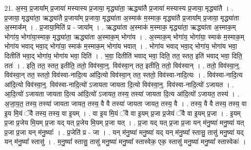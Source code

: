 \documentclass[17pt]{extarticle}
\begin{document}
21. अ॒स्य॒ प्र॒जाया᳚म् प्र॒जाया॑ मस्यास्य प्र॒जाया॒ मृद्ध्या॑ता॒ ऋद्ध्या॑तै प्र॒जाया॑ मस्यास्य प्र॒जाया॒ मृद्ध्या॑तै । . प्र॒जाया॒ मृद्ध्या॑ता॒ ऋद्ध्या॑तै प्र॒जाया᳚म् प्र॒जाया॒ मृद्ध्या॑ता अ॒स्माक॑ म॒स्माक॒ मृद्ध्या॑तै प्र॒जाया᳚म् प्र॒जाया॒ मृद्ध्या॑ता अ॒स्माक᳚म् । . प्र॒जाया॒मिति॑ प्र - जाया᳚म् । . ऋद्ध्या॑ता अ॒स्माक॑ म॒स्माक॒ मृद्ध्या॑ता॒ ऋद्ध्या॑ता अ॒स्माक॒म् भोगा॑य॒ भोगा॑या॒स्माक॒ मृद्ध्या॑ता॒ ऋद्ध्या॑ता अ॒स्माक॒म् भोगा॑य । . अ॒स्माक॒म् भोगा॑य॒ भोगा॑या॒ स्माक॑ म॒स्माक॒म् भोगा॑य भवाद् भवा॒द् भोगा॑या॒ स्माक॑ म॒स्माक॒म् भोगा॑य भवात् । . भोगा॑य भवाद् भवा॒द् भोगा॑य॒ भोगा॑य भवा॒ दितीति॑ भवा॒द् भोगा॑य॒ भोगा॑य भवा॒ दिति॑ । . भ॒वा॒ दितीति॑ भवाद् भवा॒ दिति॒ तत॒ स्तत॒ इति॑ भवाद् भवा॒ दिति॒ ततः॑ । . इति॒ तत॒ स्तत॒ इतीति॒ ततो॒ विव॑स्वा॒न्॒. विव॑स्वा॒न् तत॒ इतीति॒ ततो॒ विव॑स्वान् । . ततो॒ विव॑स्वा॒न्॒. विव॑स्वा॒न् तत॒ स्ततो॒ विव॑स्वा-नादि॒त्य आ॑दि॒त्यो विव॑स्वा॒न् तत॒ स्ततो॒ विव॑स्वा-नादि॒त्यः । . विव॑स्वा-नादि॒त्य आ॑दि॒त्यो विव॑स्वा॒न्॒. विव॑स्वा-नादि॒त्यो॑ ऽजायता जायता दि॒त्यो विव॑स्वा॒न्॒. विव॑स्वा-नादि॒त्यो॑ ऽजायत । . आ॒दि॒त्यो॑ ऽजायता जायता दि॒त्य आ॑दि॒त्यो॑ ऽजायत॒ तस्य॒ तस्या॑ जायता दि॒त्य आ॑दि॒त्यो॑ ऽजायत॒ तस्य॑ । . अ॒जा॒य॒त॒ तस्य॒ तस्या॑ जायता जायत॒ तस्य॒ वै वै तस्या॑ जायता जायत॒ तस्य॒ वै । . तस्य॒ वै वै तस्य॒ तस्य॒ वा इ॒य मि॒यं ॅवै तस्य॒ तस्य॒ वा इ॒यम् । . वा इ॒य मि॒यं ॅवै वा इ॒यम् प्र॒जा प्र॒जेयं ॅवै वा इ॒यम् प्र॒जा । . इ॒यम् प्र॒जा प्र॒जेय मि॒यम् प्र॒जा यद् यत् प्र॒जेय मि॒यम् प्र॒जा यत् । . प्र॒जा यद् यत् प्र॒जा प्र॒जा यन् म॑नु॒ष्या॑ मनु॒ष्या॑ यत् प्र॒जा प्र॒जा यन् म॑नु॒ष्याः᳚ । . प्र॒जेति॑ प्र - जा । . यन् म॑नु॒ष्या॑ मनु॒ष्या॑ यद् यन् म॑नु॒ष्या᳚ स्तासु॒ तासु॑ मनु॒ष्या॑ यद् यन् म॑नु॒ष्या᳚ स्तासु॑ । . म॒नु॒ष्या᳚ स्तासु॒ तासु॑ मनु॒ष्या॑ मनु॒ष्या᳚ स्तास्वेक॒ एक॒ स्तासु॑ मनु॒ष्या॑ मनु॒ष्या᳚ स्तास्वेकः॑ । \newline
\end{document}
